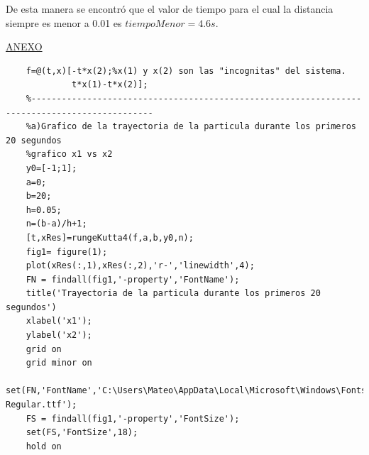 \documentclass[11pt]{article}
\begin{document}
De esta manera se encontró que el valor de tiempo para el cual la distancia siempre es menor a 0.01 es $tiempoMenor=4.6s$.
\clearpage
\begin{center}
	\newcommand{\HRule}{\rule{\linewidth}{0.5mm}}
	\vspace*{1.0cm}								%
	\textsc{\huge \underline{ANEXO} \vspace{5px}}\\

\end{center}
\begin{lstlisting}[caption=Entregable3.m]
	%Ejercicio Entregable 3
	f=@(t,x)[-t*x(2);%x(1) y x(2) son las "incognitas" del sistema.
			 t*x(1)-t*x(2)];
	%----------------------------------------------------------------------------------------------
	%a)Grafico de la trayectoria de la particula durante los primeros 20 segundos
	%grafico x1 vs x2
	y0=[-1;1];
	a=0;
	b=20;
	h=0.05;
	n=(b-a)/h+1;
	[t,xRes]=rungeKutta4(f,a,b,y0,n);
	fig1= figure(1);
	plot(xRes(:,1),xRes(:,2),'r-','linewidth',4);
	FN = findall(fig1,'-property','FontName');
	title('Trayectoria de la particula durante los primeros 20 segundos')
	xlabel('x1');
	ylabel('x2');
	grid on 
	grid minor on
	set(FN,'FontName','C:\Users\Mateo\AppData\Local\Microsoft\Windows\Fonts\DankMono-Regular.ttf');
	FS = findall(fig1,'-property','FontSize');
	set(FS,'FontSize',18);
	hold on
	

\end{lstlisting}
\end{document}

